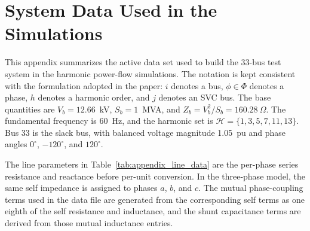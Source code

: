 \documentclass[journal]{IEEEtran}
\begin{document}



\clearpage
\appendices
\section{System Data Used in the Simulations}
\label{app:system_data}

This appendix summarizes the active data set used to build the 33-bus test
system in the harmonic power-flow simulations. The notation is kept consistent
with the formulation adopted in the paper: $i$ denotes a bus, $\phi\in\Phi$
denotes a phase, $h$ denotes a harmonic order, and $j$ denotes an SVC bus. The
base quantities are $V_b=12.66$~kV, $S_b=1$~MVA, and
$Z_b=V_b^2/S_b=160.28~\Omega$. The fundamental frequency is 60~Hz, and the
harmonic set is $\mathcal{H}=\{1,3,5,7,11,13\}$. Bus 33 is the slack bus,
with balanced voltage magnitude 1.05~pu and phase angles $0^\circ$,
$-120^\circ$, and $120^\circ$.

The line parameters in Table~\ref{tab:appendix_line_data} are the per-phase
series resistance and reactance before per-unit conversion. In the three-phase
model, the same self impedance is assigned to phases $a$, $b$, and $c$. The
mutual phase-coupling terms used in the data file are generated from the
corresponding self terms as one eighth of the self resistance and inductance,
and the shunt capacitance terms are derived from those mutual inductance
entries.
\end{document}
